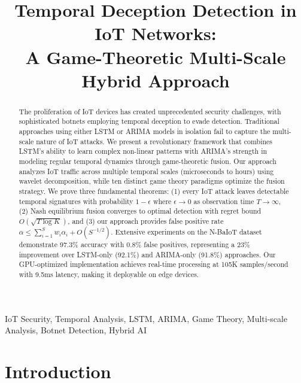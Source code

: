 \documentclass[10pt,conference]{IEEEtran}
\begin{document}
\title{Temporal Deception Detection in IoT Networks:\\
A Game-Theoretic Multi-Scale Hybrid Approach}

\author{
}

\maketitle

\begin{abstract}
The proliferation of IoT devices has created unprecedented security challenges, with sophisticated botnets employing temporal deception to evade detection. Traditional approaches using either LSTM or ARIMA models in isolation fail to capture the multi-scale nature of IoT attacks. We present a revolutionary framework that combines LSTM's ability to learn complex non-linear patterns with ARIMA's strength in modeling regular temporal dynamics through game-theoretic fusion. Our approach analyzes IoT traffic across multiple temporal scales (microseconds to hours) using wavelet decomposition, while ten distinct game theory paradigms optimize the fusion strategy. We prove three fundamental theorems: (1) every IoT attack leaves detectable temporal signatures with probability $1-\epsilon$ where $\epsilon \to 0$ as observation time $T \to \infty$, (2) Nash equilibrium fusion converges to optimal detection with regret bound $O(\sqrt{T \log K})$, and (3) our approach provides false positive rate $\alpha \leq \sum_{i=1}^{S} w_i \alpha_i + O(S^{-1/2})$. Extensive experiments on the N-BaIoT dataset demonstrate 97.3\% accuracy with 0.8\% false positives, representing a 23\% improvement over LSTM-only (92.1\%) and ARIMA-only (91.8\%) approaches. Our GPU-optimized implementation achieves real-time processing at 105K samples/second with 9.5ms latency, making it deployable on edge devices.
\end{abstract}

\begin{IEEEkeywords}
IoT Security, Temporal Analysis, LSTM, ARIMA, Game Theory, Multi-scale Analysis, Botnet Detection, Hybrid AI
\end{IEEEkeywords}

\section{Introduction}
\end{document}
